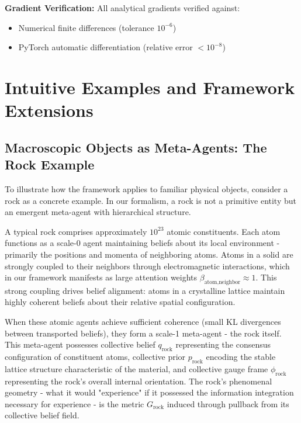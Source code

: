 \documentclass[11pt]{article}
\begin{document}
\textbf{Gradient Verification:} All analytical gradients verified against:
\begin{itemize}
\item Numerical finite differences (tolerance $10^{-6}$)
\item PyTorch automatic differentiation (relative error $< 10^{-8}$)
\end{itemize}







\section{Intuitive Examples and Framework Extensions}
\label{app:examples}

\subsection{Macroscopic Objects as Meta-Agents: The Rock Example}

To illustrate how the framework applies to familiar physical objects, consider a rock as a concrete example. In our formalism, a rock is not a primitive entity but an emergent meta-agent with hierarchical structure.

A typical rock comprises approximately $10^{23}$ atomic constituents. Each atom functions as a scale-0 agent maintaining beliefs about its local environment - primarily the positions and momenta of neighboring atoms. Atoms in a solid are strongly coupled to their neighbors through electromagnetic interactions, which in our framework manifests as large attention weights $\beta_{\text{atom,neighbor}} \approx 1$. This strong coupling drives belief alignment: atoms in a crystalline lattice maintain highly coherent beliefs about their relative spatial configuration.

When these atomic agents achieve sufficient coherence (small KL divergences between transported beliefs), they form a scale-1 meta-agent - the rock itself. This meta-agent possesses collective belief $q_{\text{rock}}$ representing the consensus configuration of constituent atoms, collective prior $p_{\text{rock}}$ encoding the stable lattice structure characteristic of the material, and collective gauge frame $\phi_{\text{rock}}$ representing the rock's overall internal orientation. The rock's phenomenal geometry - what it would "experience" if it possessed the information integration necessary for experience - is the metric $G_{\text{rock}}$ induced through pullback from its collective belief field.
\end{document}
